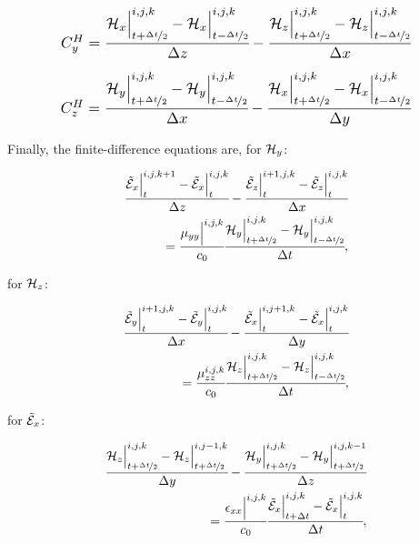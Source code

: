 \begin{align}
    \resizebox{.8\hsize}{!}{$
        \CHy = \cfrac{\Hht_x\Big|^{i,j,k}_{t+\nicefrac{\dt}{2}}-\Hht_x\Big|^{i,j,k}_{t-\nicefrac{\dt}{2}}}{\dz} - \cfrac{\Hht_z\Big|^{i,j,k}_{t+\nicefrac{\dt}{2}}-\Hht_z\Big|^{i,j,k}_{t-\nicefrac{\dt}{2}}}{\dx}
        \label{eq:CHy}
    $}
\end{align}


\begin{align}
    \resizebox{.8\hsize}{!}{$
        \CHz = \cfrac{\Hht_y\Big|^{i,j,k}_{t+\nicefrac{\dt}{2}}-\Hht_y\Big|^{i,j,k}_{t-\nicefrac{\dt}{2}}}{\dx} - \cfrac{\Hht_x\Big|^{i,j,k}_{t+\nicefrac{\dt}{2}}-\Hht_x\Big|^{i,j,k}_{t-\nicefrac{\dt}{2}}}{\dy}
        \label{eq:CHz}
    $}
\end{align}


Finally, the finite-difference equations are, for $\mathcal{H}_y$:

\begin{align}
    \cfrac{\tilde{\mathcal{E}}_x\Big|^{i,j,k+1}_{t}-\tilde{\mathcal{E}}_x\Big|^{i,j,k}_{t}}{\Delta z} - \cfrac{\tilde{\mathcal{E}}_z\Big|^{i+1,j,k}_{t}-\tilde{\mathcal{E}}_z\Big|^{i,j,k}_{t}}{\Delta x} \nonumber \\ 
    =\cfrac{\mu_{yy}\Big|^{i,j,k}}{c_0}\cfrac{\mathcal{H}_y\Big|^{i,j,k}_{t+\nicefrac{\Delta t}{2}} - \mathcal{H}_y\Big|^{i,j,k}_{t-\nicefrac{\Delta t}{2}}}{\Delta t},
    \label{eq:fd_hy}
\end{align}

for $\mathcal{H}_z$:

\begin{align}
    \cfrac{\tilde{\mathcal{E}}_y\Big|^{i+1,j,k}_{t}-\tilde{\mathcal{E}}_y\Big|^{i,j,k}_{t}}{\Delta x} - \cfrac{\tilde{\mathcal{E}}_x\Big|^{i,j+1,k}_{t}-\tilde{\mathcal{E}}_x\Big|^{i,j,k}_{t}}{\Delta y} \nonumber \\
    =\cfrac{\mu_{zz}^{i,j,k}}{c_0}\cfrac{\mathcal{H}_z\Big|^{i,j,k}_{t+\nicefrac{\Delta t}{2}} - \mathcal{H}_z\Big|^{i,j,k}_{t-\nicefrac{\Delta t}{2}}}{\Delta t},
    \label{eq:fd_hz}
\end{align}

for $\tilde{\mathcal{E}}_x$:

\begin{small}
    \begin{align}
        \cfrac{\mathcal{H}_z\Big|^{i,j,k}_{t+\nicefrac{\Delta t}{2}}-\mathcal{H}_z\Big|^{i,j-1,k}_{t+\nicefrac{\Delta t}{2}}}{\Delta y} - \cfrac{\mathcal{H}_y\Big|^{i,j,k}_{t+\nicefrac{\Delta t}{2}}-\mathcal{H}_y\Big|^{i,j,k-1}_{t+\nicefrac{\Delta t}{2}}}{\Delta z} \nonumber\\
        =
        \cfrac{\epsilon_{xx}\Big|^{i,j,k}}{c_0}\cfrac{\tilde{\mathcal{E}}_x\Big|^{i,j,k}_{t+\Delta t}-\tilde{\mathcal{E}}_x\Big|^{i,j,k}_{t}}{\Delta t},
        \label{eq:fd_ex}
    \end{align}  
\end{small}



